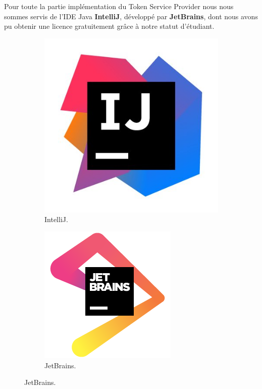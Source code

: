 \documentclass{report}
\begin{document}
\noindent
Pour toute la partie implémentation du Token Service Provider nous nous sommes servis de l'IDE Java \textbf{IntelliJ}, développé par \textbf{JetBrains}, dont nous avons pu obtenir une licence gratuitement grâce à notre statut d'étudiant.

\begin{figure}[!h]
		\centering
    \begin{subfigure}[b]{0.2\textwidth}
        \includegraphics[width=\textwidth]{img/intellij.jpg}
        \caption{IntelliJ.}
    \end{subfigure}
    \begin{subfigure}[b]{0.2\textwidth}
        \includegraphics[width=\textwidth]{img/jetbrains.png}
        \caption{JetBrains.}
    \end{subfigure}
\end{figure}
\end{document}
